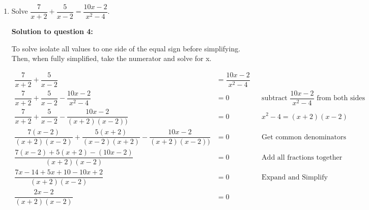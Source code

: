 \documentclass[12pt]{book}
\begin{document}
\begin{enumerate}
$$\boxed{\therefore \text{the value of c and d are -2 and 2 respectively.}}$$

\newpage

\textbf{Check Answer for Question 3 by substituting the know values of c and d back into the original equation as g(2) = 14:}

\begin{proof}
    \begin{align*}
        g(x) &= x^3 + 2x^2 + cx + d && \text{Original equation}\\
        g(x) &= x^3 + 2x^2 - 2x + 2 && \text{Since }c = -2, d = 2\\
        g(2) &= 2^3 + 2\times 2^2 - 2\times 2 + 2 && \text{Substitute x as 2}\\
        14 &= 2^3 + 2\times 2^2 - 2\times 2 + 2 && g(2) = 14\\
        14 &= 8 + 8 - 4 + 2\\
        14 &= 14 \\
        LHS &= RHS && \qedhere\\
    \end{align*}
\end{proof}

\vspace{-1cm}
$$\therefore \text{the values of c and d found are correct}$$

\newpage

\item Solve $\dfrac{7}{x+2} + \dfrac{5}{x-2} = \dfrac{10x-2}{x^2 - 4}$.

\vspace{0.5cm} 
\textbf{Solution to question 4:}

\vspace{0.3cm} 
To solve isolate all values to one side of the equal sign before simplifying. Then, when fully simplified, take the numerator and solve for x.

\begin{align*}
    \dfrac{7}{x+2} + \dfrac{5}{x-2} &= \dfrac{10x-2}{x^2 - 4} \\
    \dfrac{7}{x+2} + \dfrac{5}{x-2} - \dfrac{10x-2}{x^2 - 4} &= 0 && \text{subtract } \dfrac{10x-2}{x^2 - 4} \text{ from both sides}\\
    \dfrac{7}{x+2} + \dfrac{5}{x-2} - \dfrac{10x-2}{(x+2)(x-2))} &= 0 && x^2-4 = (x+2)(x-2)\\
    \dfrac{7(x-2)}{(x+2)(x-2)} + \dfrac{5(x+2)}{(x-2)(x+2)} - \dfrac{10x-2}{(x+2)(x-2))} &= 0 && \text{Get common denominators} \\
    \dfrac{7(x-2)+5(x+2)-(10x-2)}{(x+2)(x-2)} &= 0 && \text{Add all fractions together}\\
    \dfrac{7x-14+5x+10-10x+2}{(x+2)(x-2)} &= 0 && \text{Expand and Simplify}\\
    \dfrac{2x-2}{(x+2)(x-2)} &= 0\\
\end{align*}


\end{enumerate}
\end{document}
